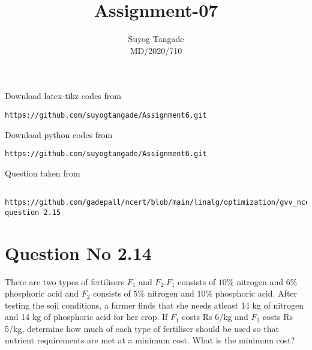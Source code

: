 \documentclass[journal,12pt,twocolumn]{IEEEtran}
\begin{document}
\makeatother
\let\StandardTheFigure\thefigure
\let\vec\mathbf
\renewcommand{\thefigure}{\theproblem}
\def\putbox#1#2#3{\makebox[0in][l]{\makebox[#1][l]{}\raisebox{\baselineskip}[0in][0in]{\raisebox{#2}[0in][0in]{#3}}}}
     \def\rightbox#1{\makebox[0in][r]{#1}}
     \def\centbox#1{\makebox[0in]{#1}}
     \def\topbox#1{\raisebox{-\baselineskip}[0in][0in]{#1}}
     \def\midbox#1{\raisebox{-0.5\baselineskip}[0in][0in]{#1}}
\vspace{3cm}
\title{Assignment-07}
\author{Suyog Tangade \\ MD/2020/710}
\maketitle
\newpage
\bigskip
\renewcommand{\thefigure}{\theenumi}
\renewcommand{\thetable}{\theenumi}
Download latex-tikz codes from
\begin{lstlisting}
https://github.com/suyogtangade/Assignment6.git
\end{lstlisting}
%
Download python codes from
\begin{lstlisting}
https://github.com/suyogtangade/Assignment6.git
\end{lstlisting}
%
Question taken from
\begin{lstlisting}
  https://github.com/gadepall/ncert/blob/main/linalg/optimization/gvv_ncert_opt.pdf question 2.15
\end{lstlisting}
\section{Question No 2.14}
 There are two types of fertilisers $F_{1}$ and $F_{2}$.$F_{1}$ consists of $10\%$ nitrogen and $6\%$
phosphoric acid and $F_{2}$ consists of $5\%$ nitrogen and $10\%$ phosphoric acid. After
testing the soil conditions, a farmer finds that she needs atleast 14 kg of nitrogen
and 14 kg of phosphoric acid for her crop. If $F_{1}$ costs Rs 6/kg and $F_{2}$ costs
Rs 5/kg, determine how much of each type of fertiliser should be used so that
nutrient requirements are met at a minimum cost. What is the minimum cost?\\
\end{document}
